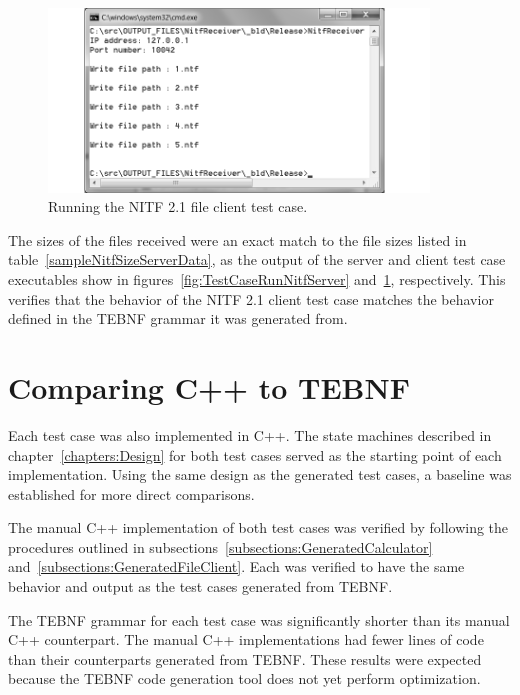 \begin{figure}[h!]
\centering
\includegraphics[width=0.9\textwidth]{figures/TestCaseRunNitfReceiver.png}
\caption{Running the NITF 2.1 file client test case.}
\label{fig:TestCaseRunNitfReceiver}
\end{figure}

\indent
The sizes of the files received were an exact match to the file sizes listed in table~\ref{sampleNitfSizeServerData}, as the output of the server and client test case executables show in figures~\ref{fig:TestCaseRunNitfServer} and~\ref{fig:TestCaseRunNitfReceiver}, respectively.  This verifies that the behavior of the NITF 2.1 client test case matches the behavior defined in the TEBNF grammar it was generated from.

\section{Comparing C++ to TEBNF}
\label{subsections:ComparingCplusplusToTEBNF}
Each test case was also implemented in C++.  The state machines described in chapter~\ref{chapters:Design} for both test cases served as the starting point of each implementation.  Using the same design as the generated test cases, a baseline was established for more direct comparisons.

\indent
The manual C++ implementation of both test cases was verified by following the  procedures outlined in subsections~\ref{subsections:GeneratedCalculator} and~\ref{subsections:GeneratedFileClient}.  Each was verified to have the same behavior and output as the test cases generated from TEBNF.

\indent
The TEBNF grammar for each test case was significantly shorter than its manual C++ counterpart.  The manual C++ implementations had fewer lines of code than their counterparts generated from TEBNF.  These results were expected because the TEBNF code generation tool does not yet perform optimization.

